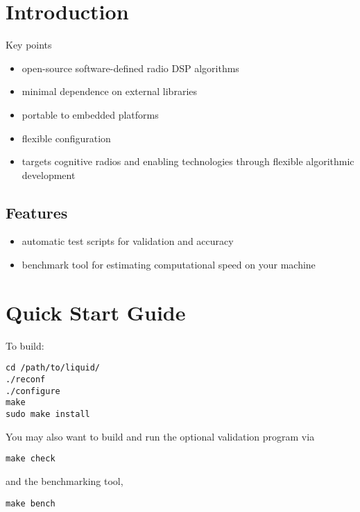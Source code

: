 \documentclass[11pt,twoside]{report}
\begin{document}

%
%

\section{Introduction}
Key points
\begin{itemize}
\item open-source software-defined radio DSP algorithms
\item minimal dependence on external libraries
\item portable to embedded platforms
\item flexible configuration
\item targets cognitive radios and enabling technologies through
      flexible algorithmic development
\end{itemize}

\subsection{Features}
\begin{itemize}
\item automatic test scripts for validation and accuracy
\item benchmark tool for estimating computational speed on your machine
\end{itemize}


\section{Quick Start Guide}
To build:
\begin{verbatim}
cd /path/to/liquid/
./reconf
./configure
make
sudo make install
\end{verbatim}
You may also want to build and run the optional validation program via
\begin{verbatim}
make check
\end{verbatim}
and the benchmarking tool,
\begin{verbatim}
make bench
\end{verbatim}
\end{document}
